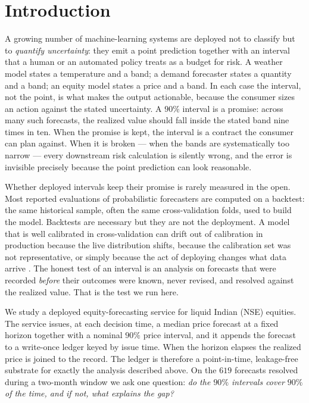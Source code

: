 \documentclass[11pt,a4paper]{article}
\begin{document}
\section{Introduction}
A growing number of machine-learning systems are deployed not to classify but to
\emph{quantify uncertainty}: they emit a point prediction together with an interval
that a human or an automated policy treats as a budget for risk. A weather model
states a temperature and a band; a demand forecaster states a quantity and a band;
an equity model states a price and a band. In each case the interval, not the point,
is what makes the output actionable, because the consumer sizes an action against
the stated uncertainty. A $90\%$ interval is a promise: across many such forecasts,
the realized value should fall inside the stated band nine times in ten. When the
promise is kept, the interval is a contract the consumer can plan against. When it
is broken --- when the bands are systematically too narrow --- every downstream risk
calculation is silently wrong, and the error is invisible precisely because the
point prediction can look reasonable.

Whether deployed intervals keep their promise is rarely measured in the open.
Most reported evaluations of probabilistic forecasters are computed on a backtest:
the same historical sample, often the same cross-validation folds, used to build
the model. Backtests are necessary but they are not the deployment. A model that is
well calibrated in cross-validation can drift out of calibration in production
because the live distribution shifts, because the calibration set was not
representative, or simply because the act of deploying changes what data arrive
\cite{guo2017,ovadia2019}. The honest test of an interval is an analysis on forecasts
that were recorded \emph{before} their outcomes were known, never revised, and
resolved against the realized value. That is the test we run here.

We study a deployed equity-forecasting service for liquid Indian (NSE) equities.
The service issues, at each decision time, a median price forecast at a fixed
horizon together with a nominal $90\%$ price interval, and it appends the forecast
to a write-once ledger keyed by issue time. When the horizon elapses the realized
price is joined to the record. The ledger is therefore a point-in-time, leakage-free
substrate for exactly the analysis described above. On the $619$ forecasts resolved
during a two-month window we ask one question: \emph{do the $90\%$ intervals cover
$90\%$ of the time, and if not, what explains the gap?}
\end{document}
